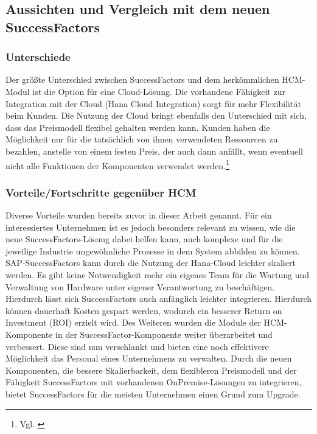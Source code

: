 \subsection{Aussichten und Vergleich mit dem neuen SuccessFactors}
\subsubsection{Unterschiede}
Der größte Unterschied zwischen SuccessFactors und dem herkömmlichen HCM-Modul ist die Option für eine Cloud-Lösung.
Die vorhandene Fähigkeit zur Integration mit der Cloud (Hana Cloud Integration) sorgt für mehr Flexibilität beim Kunden.
Die Nutzung der Cloud bringt ebenfalls den Unterschied mit sich, dass das Preismodell flexibel gehalten werden kann.
Kunden haben die Möglichkeit nur für die tatsächlich von ihnen verwendeten Ressourcen zu bezahlen, anstelle von einem festen Preis, der auch dann anfällt, wenn eventuell nicht alle Funktionen der Komponenten verwendet werden.\footnote{Vgl. \cite{SAPSE2024i}}

\subsubsection{Vorteile/Fortschritte gegenüber HCM}
Diverse Vorteile wurden bereits zuvor in dieser Arbeit genannt.
Für ein interessiertes Unternehmen ist es jedoch besonders relevant zu wissen, wie die neue SuccessFactors-Lösung dabei helfen kann, auch komplexe und für die jeweilige Industrie ungewöhnliche Prozesse in dem System abbilden zu können.
SAP-SuccessFactors kann durch die Nutzung der Hana-Cloud leichter skaliert werden.
Es gibt keine Notwendigkeit mehr ein eigenes Team für die Wartung und Verwaltung von Hardware unter eigener Verantwortung zu beschäftigen.
Hierdurch lässt sich SuccessFactors auch anfänglich leichter integrieren. Hierdurch können dauerhaft Kosten gespart werden, wodurch ein besserer Return on Investment (ROI) erzielt wird.
Des Weiteren wurden die Module der HCM-Komponente in der SuccessFactor-Komponente weiter überarbeitet und verbessert.
Diese sind nun verschlankt und bieten eine noch effektivere Möglichkeit das Personal eines Unternehmens zu verwalten.
Durch die neuen Komponenten, die bessere Skalierbarkeit, dem flexibleren Preismodell und der Fähigkeit SuccessFactors mit vorhandenen OnPremise-Lösungen zu integrieren, bietet SuccessFactors für die meisten Unternehmen einen Grund zum Upgrade.